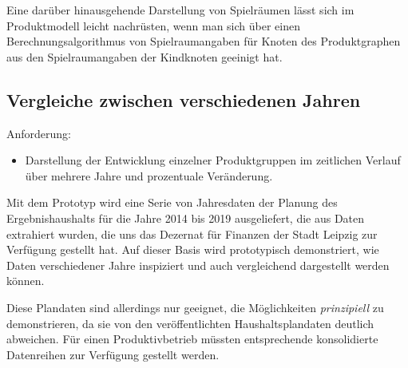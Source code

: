 \documentclass[11pt,a4paper,twoside]{article}
\begin{document}
Eine darüber hinausgehende Darstellung von Spielräumen lässt sich im
Produktmodell leicht nachrüsten, wenn man sich über einen
Berechnungsalgorithmus von Spielraumangaben für Knoten des Produktgraphen aus
den Spielraumangaben der Kindknoten geeinigt hat. 
\pagebreak

\subsection{Vergleiche zwischen verschiedenen Jahren} 

Anforderung:
\begin{itemize}\itemsep0pt
\item Darstellung der Entwicklung einzelner Produktgruppen im zeitlichen
  Verlauf über mehrere Jahre und prozentuale Veränderung. 
\end{itemize}

Mit dem Prototyp wird eine Serie von Jahresdaten der Planung des
Ergebnishaushalts für die Jahre 2014 bis 2019 ausgeliefert, die aus Daten
extrahiert wurden, die uns das Dezernat für Finanzen der Stadt Leipzig zur
Verfügung gestellt hat.  Auf dieser Basis wird prototypisch demonstriert, wie
Daten verschiedener Jahre inspiziert und auch vergleichend dargestellt werden
können.

Diese Plandaten sind allerdings nur geeignet, die Möglichkeiten
\emph{prinzipiell} zu demonstrieren, da sie von den veröffentlichten
Haushaltsplandaten deutlich abweichen.  Für einen Produktivbetrieb müssten
entsprechende konsolidierte Datenreihen zur Verfügung gestellt werden. 
\end{document}
